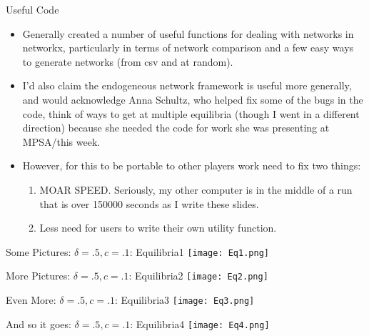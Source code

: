 \documentclass{beamer}
\begin{document}
\begin{frame}{Useful Code}
\begin{itemize}
\item Generally created a number of useful functions for dealing with networks in networkx, particularly in terms of network comparison and a few easy ways to generate networks (from csv and at random).
\item I'd also claim the endogeneous network framework is useful more generally, and would acknowledge Anna Schultz, who helped fix some of the bugs in the code, think of ways to get at multiple equilibria (though I went in a different direction) because she needed the code for work she was presenting at MPSA/this week.
\item However, for this to be portable to other players work need to fix two things:
\begin{enumerate}
\item MOAR SPEED. Seriously, my other computer is in the middle of a run that is over 150000 seconds as I write these slides.
\item Less need for users to write their own utility function.
\end{enumerate}
\end{itemize}
\end{frame}


\begin{frame}[shrink]{Some Pictures: $\delta = .5, c = .1$: Equilibria1}
\texttt{[image: Eq1.png]}
\end{frame}

\begin{frame}[shrink]{More Pictures: $\delta = .5, c = .1$: Equilibria2}
\texttt{[image: Eq2.png]}
\end{frame}

\begin{frame}[shrink]{Even More: $\delta = .5, c = .1$: Equilibria3}
\texttt{[image: Eq3.png]}
\end{frame}

\begin{frame}[shrink]{And so it goes: $\delta = .5, c = .1$: Equilibria4}
\texttt{[image: Eq4.png]}
\end{frame}
\end{document}
